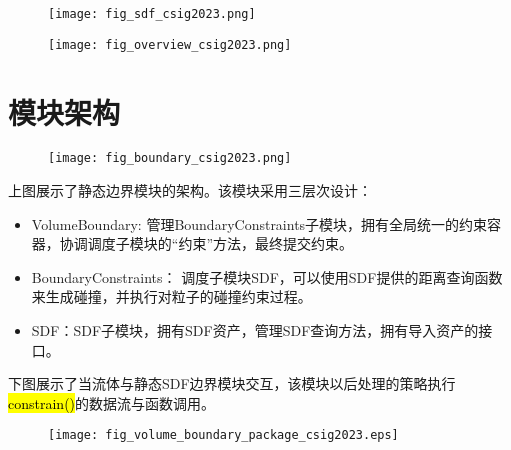 \begin{figure}[H]
	\centering
	\texttt{[image: fig\_sdf\_csig2023.png]}
\end{figure}

\begin{figure}[H]
	\centering
	\texttt{[image: fig\_overview\_csig2023.png]}
\end{figure}

\section{模块架构}

\begin{figure}[H]
	\centering
	\texttt{[image: fig\_boundary\_csig2023.png]}
\end{figure}

上图展示了静态边界模块的架构。该模块采用三层次设计：
\begin{itemize}
	\item VolumeBoundary: 管理BoundaryConstraints子模块，拥有全局统一的约束容器，协调调度子模块的“约束”方法，最终提交约束。
	\item BoundaryConstraints： 调度子模块SDF，可以使用SDF提供的距离查询函数来生成碰撞，并执行对粒子的碰撞约束过程。
	\item SDF：SDF子模块，拥有SDF资产，管理SDF查询方法，拥有导入资产的接口。
\end{itemize}
下图展示了当流体与静态SDF边界模块交互，该模块以后处理的策略执行\hl{constrain()}的数据流与函数调用。
\begin{figure}[H]
	\centering
	\texttt{[image: fig\_volume\_boundary\_package\_csig2023.eps]}
\end{figure}
